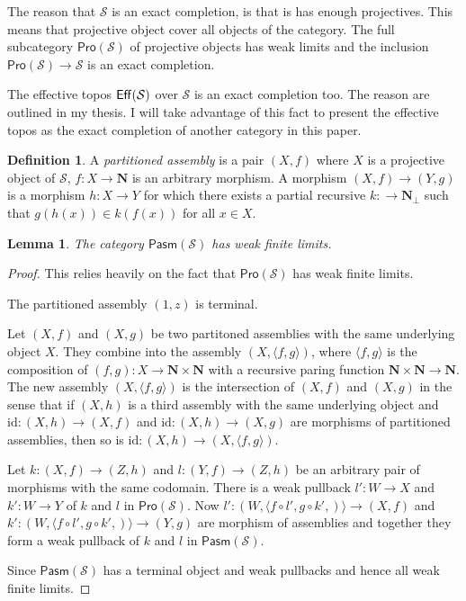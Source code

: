 \documentclass{amsart}
\theoremstyle{plain}
\newtheorem{lemma}[theorem]{Lemma}
\theoremstyle{definition}
\newtheorem{defin}[theorem]{Definition}
\newcommand\hide[1]{}
\newcommand\cat\mathcal
\newcommand\id{\mathrm{id}}
\newcommand\N{\mathbf N}
\begin{document}
\newcommand\pro{\mathsf{Pro}}
The reason that $\cat S$ is an exact completion, is that is has enough projectives. This means that projective object cover all objects of the category. The full subcategory $\pro(\cat S)$ of projective objects has weak limits and the inclusion $\pro(\cat S) \to \cat S$ is an exact completion.

The effective topos $\Eff(\cat S)$ over $\cat S$ is an exact completion too. The reason are outlined in my thesis. I will take advantage of this fact to present the effective topos as the exact completion of another category in this paper.

\newcommand\pasm{\mathsf{Pasm}}
\begin{defin} A \emph{partitioned assembly} is a pair $(X,f)$ where $X$ is a projective object of $\cat S$, $f:X\to \N$ is an arbitrary morphism. A morphism $(X,f) \to (Y,g)$ is a morphism $h:X\to Y$ for which there exists a partial recursive $k:\to \N_\bot$ such that $g(h(x))\in k(f(x))$ for all $x\in X$. \label{pas}
\end{defin}%

\hide{De epimorfismes veroorzaken verwarring. Hoe het codomein is ingebed in de natuurlijke getallen bepaalt mede of een functie getracked word. Daar gaan mijn mooie plannen.}

\begin{lemma} The category $\pasm(\cat S)$ has weak finite limits. \end{lemma}

\newcommand\pair[2]{\langle #1,#2\rangle}
\begin{proof} This relies heavily on the fact that $\pro(\cat S)$ has weak finite limits.

The partitioned assembly $(1,z)$ is terminal.

Let $(X,f)$ and $(X,g)$ be two partitoned assemblies with the same underlying object $X$. They combine into the assembly $(X,\pair fg)$, where $\pair fg$ is the composition of $(f,g):X\to \N\times \N$ with a recursive paring function $\N\times \N \to \N$. The new assembly $(X,\pair fg)$ is the intersection of $(X,f)$ and $(X,g)$ in the sense that if $(X,h)$ is a third assembly with the same underlying object and $\id:(X,h) \to (X,f)$ and $\id:(X,h) \to (X,g)$ are morphisms of partitioned assemblies, then so is $\id:(X,h) \to (X,\pair fg)$.

Let $k:(X,f) \to (Z,h)$ and $l:(Y,f) \to (Z,h)$ be an arbitrary pair of morphisms with the same codomain. There is a weak pullback $l':W\to X$ and $k':W\to Y$ of $k$ and $l$ in $\pro(\cat S)$. Now $l':(W,\pair{f\circ l',g\circ k'}) \to (X,f)$ and $k':(W,\pair{f\circ l',g\circ k'}) \to (Y,g)$ are morphism of assemblies and together they form a weak pullback of $k$ and $l$ in $\pasm(\cat S)$.

Since $\pasm(\cat S)$ has a terminal object and weak pullbacks and hence all weak finite limits.
\end{proof}
\end{document}
